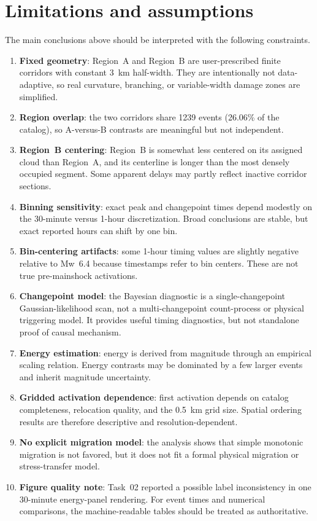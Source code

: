 \documentclass[11pt]{article}
\begin{document}
\section{Limitations and assumptions}
The main conclusions above should be interpreted with the following constraints.
\begin{enumerate}[label=\arabic*)]
    \item \textbf{Fixed geometry}: Region~A and Region~B are user-prescribed finite corridors with constant 3~km half-width. They are intentionally not data-adaptive, so real curvature, branching, or variable-width damage zones are simplified.
    \item \textbf{Region overlap}: the two corridors share 1239 events (26.06\% of the catalog), so A-versus-B contrasts are meaningful but not independent.
    \item \textbf{Region~B centering}: Region~B is somewhat less centered on its assigned cloud than Region~A, and its centerline is longer than the most densely occupied segment. Some apparent delays may partly reflect inactive corridor sections.
    \item \textbf{Binning sensitivity}: exact peak and changepoint times depend modestly on the 30-minute versus 1-hour discretization. Broad conclusions are stable, but exact reported hours can shift by one bin.
    \item \textbf{Bin-centering artifacts}: some 1-hour timing values are slightly negative relative to Mw~6.4 because timestamps refer to bin centers. These are not true pre-mainshock activations.
    \item \textbf{Changepoint model}: the Bayesian diagnostic is a single-changepoint Gaussian-likelihood scan, not a multi-changepoint count-process or physical triggering model. It provides useful timing diagnostics, but not standalone proof of causal mechanism.
    \item \textbf{Energy estimation}: energy is derived from magnitude through an empirical scaling relation. Energy contrasts may be dominated by a few larger events and inherit magnitude uncertainty.
    \item \textbf{Gridded activation dependence}: first activation depends on catalog completeness, relocation quality, and the 0.5~km grid size. Spatial ordering results are therefore descriptive and resolution-dependent.
    \item \textbf{No explicit migration model}: the analysis shows that simple monotonic migration is not favored, but it does not fit a formal physical migration or stress-transfer model.
    \item \textbf{Figure quality note}: Task~02 reported a possible label inconsistency in one 30-minute energy-panel rendering. For event times and numerical comparisons, the machine-readable tables should be treated as authoritative.
\end{enumerate}
\end{document}
